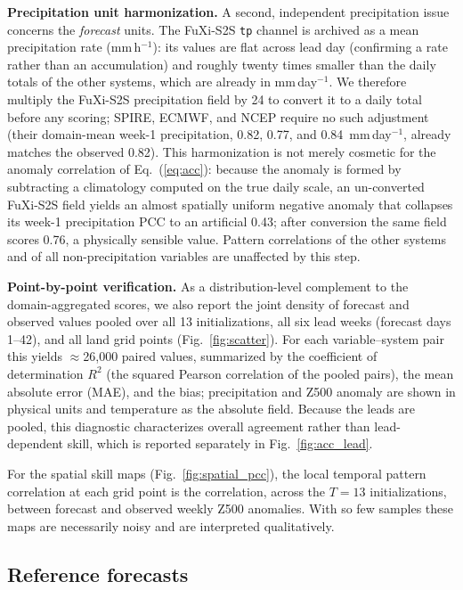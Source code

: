 \documentclass[11pt]{article}
\begin{document}
\textbf{Precipitation unit harmonization.} A second, independent
precipitation issue concerns the \emph{forecast} units. The FuXi-S2S
\texttt{tp} channel is archived as a mean precipitation rate
(mm\,h$^{-1}$): its values are flat across lead day (confirming a rate
rather than an accumulation) and roughly twenty times smaller than the
daily totals of the other systems, which are already in mm\,day$^{-1}$.
We therefore multiply the FuXi-S2S precipitation field by 24 to convert
it to a daily total before any scoring; SPIRE, ECMWF, and NCEP require no
such adjustment (their domain-mean week-1 precipitation, 0.82, 0.77, and
0.84~mm\,day$^{-1}$, already matches the observed 0.82). This
harmonization is not merely cosmetic for the anomaly correlation of
Eq.~(\ref{eq:acc}): because the anomaly is formed by subtracting a
climatology computed on the true daily scale, an un-converted FuXi-S2S
field yields an almost spatially uniform negative anomaly that collapses
its week-1 precipitation PCC to an artificial 0.43; after conversion the
same field scores 0.76, a physically sensible value. Pattern
correlations of the other systems and of all non-precipitation variables
are unaffected by this step.

\textbf{Point-by-point verification.} As a distribution-level complement
to the domain-aggregated scores, we also report the joint density of
forecast and observed values pooled over all 13 initializations, all six
lead weeks (forecast days 1--42), and all land grid points
(Fig.~\ref{fig:scatter}). For each variable--system pair this yields
$\approx$26{,}000 paired values, summarized by the coefficient of
determination $R^{2}$ (the squared Pearson correlation of the pooled
pairs), the mean absolute error (MAE), and the bias; precipitation and
Z500 anomaly are shown in physical units and temperature as the absolute
field. Because the leads are pooled, this diagnostic characterizes
overall agreement rather than lead-dependent skill, which is reported
separately in Fig.~\ref{fig:acc_lead}.

For the spatial skill maps (Fig.~\ref{fig:spatial_pcc}), the local
temporal pattern correlation at each grid point is the correlation,
across the $T=13$ initializations, between forecast and observed weekly
Z500 anomalies. With so few samples these maps are necessarily noisy and
are interpreted qualitatively.

\subsection{Reference forecasts}\label{sec:baselines}
\end{document}
